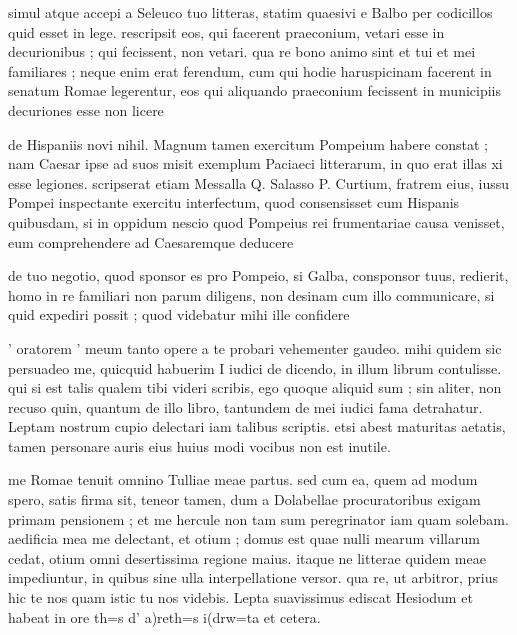 


 simul atque accepi a Seleuco tuo litteras, statim quaesivi e Balbo per codicillos quid esset in lege. rescripsit eos, qui facerent praeconium, vetari esse in decurionibus ; qui fecissent, non vetari. qua re bono animo sint et tui et mei familiares ; neque enim erat ferendum, cum qui hodie haruspicinam facerent in senatum Romae legerentur, eos qui aliquando praeconium fecissent in municipiis decuriones esse non licere

 de Hispaniis novi nihil. Magnum tamen exercitum Pompeium habere constat ; nam Caesar ipse ad suos misit exemplum Paciaeci litterarum, in quo erat illas xi esse legiones. scripserat etiam Messalla Q. Salasso P. Curtium, fratrem eius, iussu Pompei inspectante exercitu interfectum, quod consensisset cum Hispanis quibusdam, si in oppidum nescio quod Pompeius rei frumentariae causa venisset, eum comprehendere ad Caesaremque deducere

 de tuo negotio, quod sponsor es pro Pompeio, si Galba, consponsor tuus, redierit, homo in re familiari non parum diligens, non desinam cum illo communicare, si quid expediri possit ; quod videbatur mihi ille confidere

 ' oratorem ' meum tanto opere a te probari vehementer gaudeo. mihi quidem sic persuadeo me, quicquid habuerim I iudici de dicendo, in illum librum contulisse. qui si est talis qualem tibi videri scribis, ego quoque aliquid sum ; sin aliter, non recuso quin, quantum de illo libro, tantundem de mei iudici fama detrahatur. Leptam nostrum cupio delectari iam talibus scriptis. etsi abest maturitas aetatis, tamen personare auris eius huius modi vocibus non est inutile.

 me Romae tenuit omnino Tulliae meae partus. sed cum ea, quem ad modum spero, satis firma sit, teneor tamen, dum a Dolabellae procuratoribus exigam primam pensionem ; et me hercule non tam sum peregrinator iam quam solebam. aedificia mea me delectant, et otium ; domus est quae nulli mearum villarum cedat, otium omni desertissima regione maius. itaque ne litterae quidem meae impediuntur, in quibus sine ulla interpellatione versor. qua re, ut arbitror, prius hic te nos quam istic tu nos videbis. Lepta suavissimus ediscat Hesiodum et habeat in ore th=s d' a)reth=s i(drw=ta et cetera.
